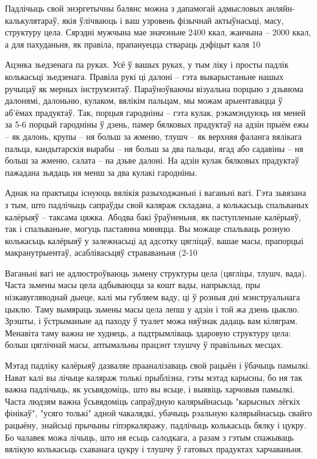 Падлічыць свой энэргетычны балянс можна з дапамогай адмысловых анляйн-калькулятараў, якія ўлічваюць і ваш узровень фізычнай актыўнасьці, масу, структуру цела. Сярэдні мужчына мае значэньне 2400 ккал, жанчына – 2000 ккал, а для пахуданьня, як правіла, прапануецца ствараць дэфіцыт каля 10%

Ацэнка зьедзенага па руках. Усё ў вашых руках, у тым ліку і просты падлік колькасьці зьедзенага. Правіла рукі ці далоні – гэта выкарыстаньне нашых ручыцаў як мерных інструмэнтаў. Параўноўваючы візуальна порцыю з дзьвюма далонямі, далоньню, кулаком, вялікім пальцам, мы можам арыентавацца ў аб'ёмах прадуктаў. Так, порцыя гародніны – гэта кулак, рэкамэндуюць ня меней за 5-6 порцый гародніны ў дзень, памер бялковых прадуктаў на адзін прыём ежы – як далонь, крупы – ня больш за жменю, тлушч – як верхняя фаланга вялікага пальца, кандытарскія вырабы – ня больш за два пальцы, ягад або садавіны – ня больш за жменю, салата – на дзьве далоні. На адзін кулак бялковых прадуктаў пажадана зьядаць ня менш за два кулакі гародніны.

Аднак на практыцы існуюць вялікія разыходжаньні і ваганьні вагі. Гэта зьвязана з тым, што падлічыць сапраўды свой каляраж складана, а колькасьць спальваных калёрыяў – таксама цяжка. Абодва бакі ўраўненьня, як паступленьне калёрыяў, так і спальваньне, могуць пастаянна мяняцца. Вы можаце спальваць розную колькасьць калёрыяў у залежнасьці ад адсотку цягліцаў, вашае масы, прапорцыі макранутрыентаў, асаблівасьцяў страваваньня (2-10%

Ваганьні вагі не адлюстроўваюць зьмену структуры цела (цягліцы, тлушч, вада). Часта зьмены масы цела адбываюцца за кошт вады, напрыклад, пры нізкавугляводнай дыеце, калі мы губляем ваду, ці ў розныя дні мэнструальнага цыклю. Таму вымяраць зьмены масы цела лепш у адзін і той жа дзень цыклю. Зрэшты, і ўстрыманьне ад паходу ў туалет можа няўзнак дадаць вам кіляграм. Менавіта таму важна не худнець, а падтрымліваць здаровую структуру цела: больш цяглічнай масы, аптымальны працэнт тлушчу ў правільных месцах.

Мэтад падліку калёрыяў дазваляе прааналізаваць свой рацыён і ўбачыць памылкі. Нават калі вы лічыце каляраж толькі прыблізна, гэты мэтад карысны, бо ня так важна падлічыць, як усьвядоміць, што вы ясьце, і выявіць харчовыя памылкі. Часта людзям важна ўсьвядоміць сапраўдную калярыйнасьць "карысных лёгкіх фінікаў", "усяго толькі" адной чакалядкі, убачыць рэальную калярыйнасьць свайго рацыёну, знайсьці прычыны гіпэркаляражу, падлічыць колькасьць бялку і цукру. Бо чалавек можа лічыць, што ня есьць салодкага, а разам з гэтым спажываць вялікую колькасьць схаванага цукру і тлушчу ў гатовых прадуктах харчаваньня.

